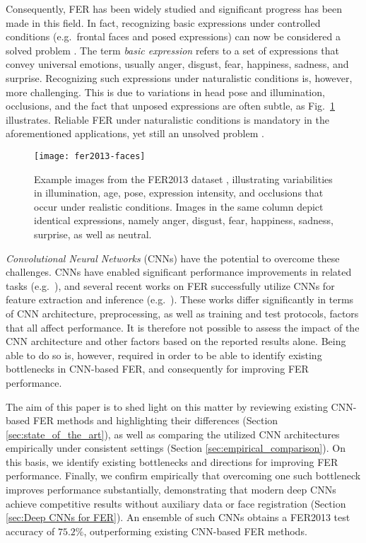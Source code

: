 \documentclass[conference,10pt,a4paper]{IEEEtran}
\begin{document}
Consequently, FER has been widely studied and significant progress has been made in this field. In fact, recognizing basic expressions under controlled conditions (e.g.~frontal faces and posed expressions) can now be considered a solved problem \cite{sariyanidi15}. The term \emph{basic expression} refers to a set of expressions that convey universal emotions, usually anger, disgust, fear, happiness, sadness, and surprise. Recognizing such expressions under naturalistic conditions is, however, more challenging. This is due to variations in head pose and illumination, occlusions, and the fact that unposed expressions are often subtle, as Fig.~\ref{fig:fer2013-faces} illustrates. Reliable FER under naturalistic conditions is mandatory in the aforementioned applications, yet still an unsolved problem \cite{sariyanidi15,martinez16}.

\begin{figure}[!t]
\centering
\texttt{[image: fer2013-faces]}
\caption{Example images from the FER2013 dataset \cite{goodfellow15}, illustrating variabilities in illumination, age, pose, expression intensity, and occlusions that occur under realistic conditions. Images in the same column depict identical expressions, namely anger, disgust, fear, happiness, sadness, surprise, as well as neutral.}
\label{fig:fer2013-faces}
\end{figure}



\emph{Convolutional Neural Networks} (CNNs) have the potential to overcome these challenges. CNNs have enabled significant performance improvements in related tasks (e.g.~\cite{krizhevsky12,he15,schroff15}), and several recent works on FER successfully utilize CNNs for feature extraction and inference (e.g.~\cite{tang13,yu15,kim16cvpr}). These works differ significantly in terms of CNN architecture, preprocessing, as well as training and test protocols, factors that all affect performance. It is therefore not possible to assess the impact of the CNN architecture and other factors based on the reported results alone. Being able to do so is, however, required in order to be able to identify existing bottlenecks in CNN-based FER, and consequently for improving FER performance.



The aim of this paper is to shed light on this matter by reviewing existing CNN-based FER methods and  highlighting their differences (Section \ref{sec:state_of_the_art}), as well as comparing the utilized CNN architectures empirically under consistent settings (Section \ref{sec:empirical_comparison}). On this basis, we identify existing bottlenecks and directions for improving FER performance. Finally, we confirm empirically that overcoming one such bottleneck improves performance substantially, demonstrating that modern deep CNNs achieve competitive results without auxiliary data or face registration (Section \ref{sec:Deep CNNs for FER}). An ensemble of such CNNs obtains a FER2013 \cite{goodfellow15} test accuracy of $75.2\%$, outperforming existing CNN-based FER methods.
\end{document}
